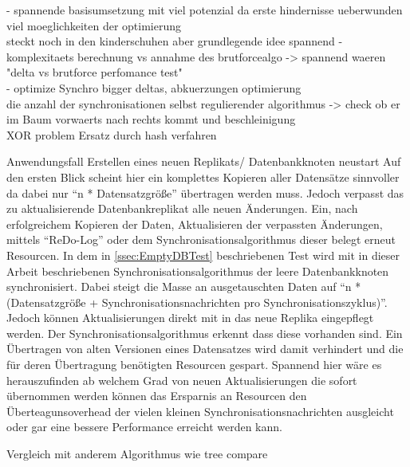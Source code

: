 \documentclass[a4paper,11pt,oneside,%
headsepline,												%
footsepline,												%
bibtotocnumbered									%
]{scrreprt}
\begin{document}
- spannende basisumsetzung mit viel potenzial da erste hindernisse ueberwunden viel moeglichkeiten der optimierung\\ steckt noch in den kinderschuhen aber grundlegende idee spannend
- komplexitaets berechnung vs annahme des brutforcealgo -> spannend waeren "delta vs brutforce perfomance test"\\
- optimize Synchro bigger deltas, abkuerzungen optimierung\\

die anzahl der synchronisationen selbst regulierender algorithmus -> check ob er im Baum vorwaerts nach rechts kommt und beschleinigung\\

XOR problem Ersatz durch hash verfahren

Anwendungsfall Erstellen eines neuen Replikats/ Datenbankknoten neustart
Auf den ersten Blick scheint hier ein komplettes Kopieren aller Datensätze sinnvoller da dabei nur \enquote{n * Datensatzgröße} übertragen werden muss. Jedoch verpasst das zu aktualisierende Datenbankreplikat alle neuen Änderungen. Ein, nach erfolgreichem Kopieren der Daten, Aktualisieren der verpassten Änderungen, mittels \enquote{ReDo-Log} oder dem Synchronisationsalgorithmus dieser belegt erneut Resourcen. In dem in \autoref{ssec:EmptyDBTest} beschriebenen Test wird mit in dieser Arbeit beschriebenen Synchronisationsalgorithmus der leere Datenbankknoten synchronisiert. Dabei steigt die Masse an ausgetauschten Daten auf \enquote{n * (Datensatzgröße + Synchronisationsnachrichten pro Synchronisationszyklus)}. Jedoch können Aktualisierungen direkt mit in das neue Replika eingepflegt werden. Der Synchronisationsalgorithmus erkennt dass diese vorhanden sind. Ein Übertragen von alten Versionen eines Datensatzes wird damit verhindert und die für deren Übertragung benötigten Resourcen gespart. Spannend hier wäre es herauszufinden ab welchem Grad von neuen Aktualisierungen die sofort übernommen werden können das Ersparnis an Resourcen den Überteagunsoverhead der vielen kleinen Synchronisationsnachrichten ausgleicht oder gar eine bessere Performance erreicht werden kann. 

Vergleich mit anderem Algorithmus wie tree compare
\newpage
\listoftodos[Notes]

\newpage
\printbibheading
\printbibliography[type=book,heading=subbibliography,title={Buch Quellen}]
\printbibliography[nottype=book,heading=subbibliography,title={Andere Quellen}]

\end{document}
